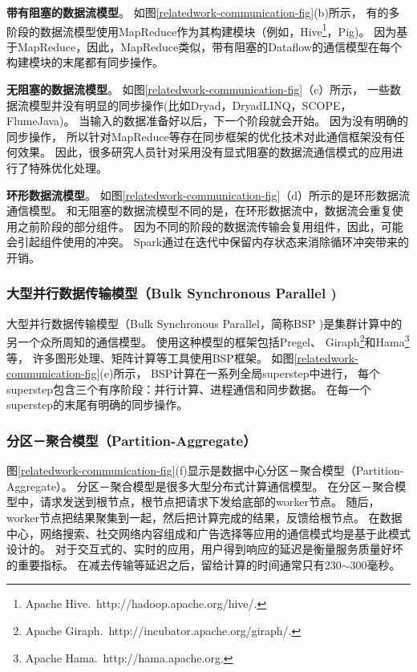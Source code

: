 \textbf{带有阻塞的数据流模型}。
如图\ref{relatedwork-communication-fig}(b)所示，
有的多阶段的数据流模型使用MapReduce作为其构建模块（例如，Hive\footnote{Apache Hive.~http://hadoop.apache.org/hive/.}，Pig\cite{Olston2008Pig})。
因为基于MapReduce，因此，MapReduce类似，带有阻塞的Dataflow的通信模型在每个构建模块的末尾都有同步操作。

\textbf{无阻塞的数据流模型}。
如图\ref{relatedwork-communication-fig}（c）所示，
一些数据流模型并没有明显的同步操作(比如Dryad\cite{Isard2007Dryad}，DryadLINQ\cite{Yu2008DryadLINQ}，SCOPE\cite{Chaiken2008SCOPE}，FlumeJava\cite{Chambers2010FlumeJava})。
当输入的数据准备好以后，下一个阶段就会开始。
因为没有明确的同步操作，
所以针对MapReduce等存在同步框架的优化技术对此通信框架没有任何效果。
因此，很多研究人员针对采用没有显式阻塞的数据流通信模式的应用进行了特殊优化处理\cite{Guo2015Spotting,Zhang2012Optimizing}。

\textbf{环形数据流模型}。
如图\ref{relatedwork-communication-fig}（d）所示的是环形数据流通信模型。
和无阻塞的数据流模型不同的是，在环形数据流中，数据流会重复使用之前阶段的部分组件。
因为不同的阶段的数据流传输会复用组件，因此，可能会引起组件使用的冲突。
Spark\cite{Zaharia2012Resilient}通过在迭代中保留内存状态来消除循环冲突带来的开销。

\subsubsection{大型并行数据传输模型（Bulk Synchronous Parallel )}
大型并行数据传输模型（Bulk Synchronous Parallel，简称BSP )是集群计算中的另一个众所周知的通信模型。
使用这种模型的框架包括Pregel\cite{Malewicz2010Pregel}、
Giraph\footnote{Apache Giraph.~http://incubator.apache.org/giraph/.}和Hama\footnote{Apache Hama.~http://hama.apache.org.}等，
许多图形处理、矩阵计算等工具使用BSP框架。
如图\ref{relatedwork-communication-fig}(e)所示，
BSP计算在一系列全局superstep中进行，
每个superstep包含三个有序阶段：并行计算、进程通信和同步数据。
在每一个superstep的末尾有明确的同步操作。

\subsubsection{分区－聚合模型（Partition-Aggregate）}
图\ref{relatedwork-communication-fig}(f)显示是数据中心分区－聚合模型（Partition-Aggregate）。
分区－聚合模型是很多大型分布式计算通信模型。
在分区－聚合模型中，请求发送到根节点，根节点把请求下发给底部的worker节点。
随后，worker节点把结果聚集到一起，然后把计算完成的结果，反馈给根节点。
在数据中心，网络搜索、社交网络内容组成和广告选择等应用的通信模式均是基于此模式设计的。
对于交互式的、实时的应用，用户得到响应的延迟是衡量服务质量好坏的重要指标。
在减去传输等延迟之后，留给计算的时间通常只有230$\sim$300毫秒。

